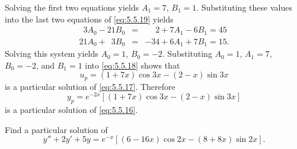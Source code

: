 \begin{examplesolution}
\begin{equation}
\end{equation}
Solving the first two equations yields $A_{1}=7$, $B_{1}=1$. Substituting these values into the last
two equations of \eqref{eq:5.5.19} yields
\begin{eqnarray*}
  \phantom{2}3A_{0}-21B_{0} & = & \phantom{-3}2+7A_{1}-6B_{1}=45\phantom{.} \\
  21A_{0}+\phantom{2}3B_{0} & = & -34+6A_{1}+7B_{1}=15.
\end{eqnarray*}
Solving this system yields $A_{0}=1$, $B_{0}=-2$. Substituting $A_{0}=1$, $A_{1}=7$, $B_{0}=-2$, and
$B_{1}=1$ into \eqref{eq:5.5.18} shows that
\[
  u_{p}=(1+7x)\cos3x-(2-x)\sin3x
\]
is a particular solution of \eqref{eq:5.5.17}. Therefore
\[
  y_{p}=e^{-2x}\left[(1+7x)\cos3x-(2-x)\sin3x\right]
\]
is a particular solution of \eqref{eq:5.5.16}.
\end{examplesolution}

\begin{example}
  \label{example:5.5.6} \rm Find a particular solution of
  \begin{equation}
    \label{eq:5.5.20}y''+2y'+5y=e^{-x}\left[(6-16x)\cos2x-(8+8x)\sin2x\right].
  \end{equation}
\end{example}

